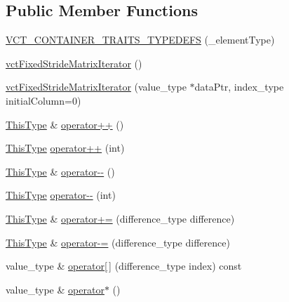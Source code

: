 \subsection*{Public Member Functions}
\begin{DoxyCompactItemize}
\item 
\hyperlink{classvct_fixed_stride_matrix_iterator_a28d34abfd80f4f25b513cc5d34bd4d30}{V\-C\-T\-\_\-\-C\-O\-N\-T\-A\-I\-N\-E\-R\-\_\-\-T\-R\-A\-I\-T\-S\-\_\-\-T\-Y\-P\-E\-D\-E\-F\-S} (\-\_\-element\-Type)
\item 
\hyperlink{classvct_fixed_stride_matrix_iterator_a20b5c57957f2ad4ea87d21c8b5c97a8a}{vct\-Fixed\-Stride\-Matrix\-Iterator} ()
\item 
\hyperlink{classvct_fixed_stride_matrix_iterator_af7c92859228313a66c16fe199eafadf6}{vct\-Fixed\-Stride\-Matrix\-Iterator} (value\-\_\-type $\ast$data\-Ptr, index\-\_\-type initial\-Column=0)
\item 
\hyperlink{classvct_fixed_stride_matrix_const_iterator_a8c6ee7d655fb71d647506c3964a18e2c}{This\-Type} \& \hyperlink{classvct_fixed_stride_matrix_iterator_a7451ed7b876740e9a6920e914bf52bf8}{operator++} ()
\item 
\hyperlink{classvct_fixed_stride_matrix_const_iterator_a8c6ee7d655fb71d647506c3964a18e2c}{This\-Type} \hyperlink{classvct_fixed_stride_matrix_iterator_a720a5f0f8ad585433dc274ba3983a499}{operator++} (int)
\item 
\hyperlink{classvct_fixed_stride_matrix_const_iterator_a8c6ee7d655fb71d647506c3964a18e2c}{This\-Type} \& \hyperlink{classvct_fixed_stride_matrix_iterator_a453c6bf30dcf86d8e9301af2f3edd49b}{operator-\/-\/} ()
\item 
\hyperlink{classvct_fixed_stride_matrix_const_iterator_a8c6ee7d655fb71d647506c3964a18e2c}{This\-Type} \hyperlink{classvct_fixed_stride_matrix_iterator_a5e895f29eb017f6f0676110d73c4d8d5}{operator-\/-\/} (int)
\item 
\hyperlink{classvct_fixed_stride_matrix_const_iterator_a8c6ee7d655fb71d647506c3964a18e2c}{This\-Type} \& \hyperlink{classvct_fixed_stride_matrix_iterator_a54c2f5b3a261e92f478f85fa6ff5038e}{operator+=} (difference\-\_\-type difference)
\item 
\hyperlink{classvct_fixed_stride_matrix_const_iterator_a8c6ee7d655fb71d647506c3964a18e2c}{This\-Type} \& \hyperlink{classvct_fixed_stride_matrix_iterator_a1a9db07b0bcc1387ddfd3a591575e013}{operator-\/=} (difference\-\_\-type difference)
\item 
value\-\_\-type \& \hyperlink{classvct_fixed_stride_matrix_iterator_ad90d735d8eed1aa18b7c727cdb894218}{operator\mbox{[}$\,$\mbox{]}} (difference\-\_\-type index) const 
\item 
value\-\_\-type \& \hyperlink{classvct_fixed_stride_matrix_iterator_a5c12155f392b523b8e51cee767488388}{operator$\ast$} ()
\end{DoxyCompactItemize}
